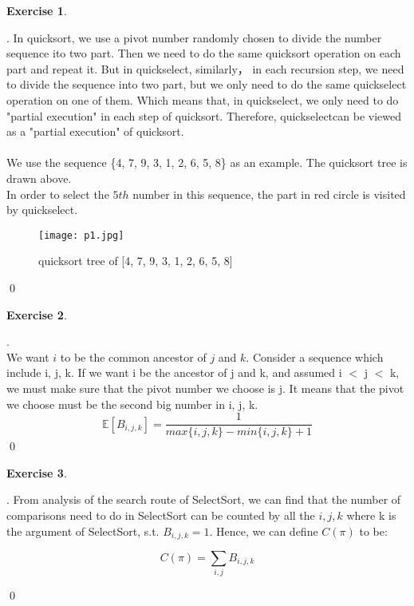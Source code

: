 \documentclass[12pt, notitlepage]{article}
\newtheorem{ex}{Exercise}
\newenvironment{sol}
  {\par\vspace{3mm}\noindent{\it Solution}.}{\qed}
\begin{document}
\begin{ex}\end{ex}
\begin{sol}
In quicksort, we use a pivot number randomly chosen to divide the number sequence ito two part. Then we need to do the same quicksort operation on each part and repeat it. But in quickselect, similarly， in each recursion step, we need to divide the sequence into two part, but we only need to do the same quickselect operation on one of them. Which means that, in quickselect, we only need to do "partial execution" in each step of quicksort. Therefore, quickselectcan be viewed as a "partial execution" of quicksort. \\ \\
We use the sequence \{4, 7, 9, 3, 1, 2, 6, 5, 8\} as an example. The quicksort tree is drawn above.\\
In order to select the $5th$ number in this sequence, the part in red circle is visited by quickselect.
\begin{figure}[H]
	\center
	\texttt{[image: p1.jpg]}\vspace{-10pt}
	\caption{quicksort tree of [4, 7, 9, 3, 1, 2, 6, 5, 8]} \nonumber\label{fig:quicksort tree}\vspace{-10pt}
\end{figure}
\end{sol}


\begin{ex}\end{ex}

\begin{sol}\\

\qquad We want $i$ to be the common ancestor of $j$ and $k$. Consider a sequence which include i, j, k. If we want i be the ancestor of j and k, and assumed i $<$ j $<$ k, we must make sure that the pivot number we choose is j. It means that the pivot we choose must be the second big number in i, j, k.
\[
\mathbb{E}[B_{i, j, k}] = \frac{1}{max\{i,j,k\}-min\{i,j,k\}+1}
\]
\end{sol}


\begin{ex}\end{ex}
\begin{sol}
From analysis of the search route of SelectSort, we can find that the number of comparisons need to do in SelectSort can be counted by all the $i, j, k$ where k is the argument of SelectSort, s.t. $B_{i, j, k} = 1$. Hence, we can define $C(\pi)$ to be:

\[
C(\pi) = \sum_{i, j} B_{i, j, k}
\]

\end{sol}
\end{document}
